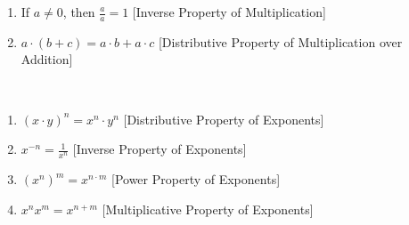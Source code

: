 \documentclass[crop=false,class=article,oneside]{standalone}
\begin{document}
\begin{properties}
\begin{enumerate}
                \item
                    \label{%
                        property:%
                        north_shore_arithmetic_properties_%
                        mult_inverse%
                    }
                    If ${a}\ne{0}$, then $\frac{a}{a}=1$\hfill
                    [Inverse Property of Multiplication]
                \item
                    \label{%
                        property:%
                        north_shore_arithmetic_properties_%
                        distributive_property%
                    }
                    ${a}\cdot{(b+c)}%
                     ={a}\cdot{b}+{a}\cdot{c}$\hfill
                    [Distributive Property of
                     Multiplication over Addition]
            \end{enumerate}
        \end{properties}
        \begin{properties}
            \
            \label{property:North_Shore_Exponent_Rules}
            \begin{enumerate}
                \item
                    \label{%
                        property:%
                        north_shore_distributive_property_%
                        of_expo%
                    }
                    $({x}\cdot{y})^{n}%
                     ={x^{n}}\cdot{y^{n}}$\hfill
                    [Distributive Property of Exponents]
                \item
                    \label{%
                        property:%
                        north_shore_inverse_property_of_expo%
                    }
                    $x^{-n}=\frac{1}{x^n}$\hfill
                    [Inverse Property of Exponents]
                \item
                    \label{%
                        property:%
                        north_shore_power_property_of_expo%
                    }
                    $(x^n)^{m}=x^{{n}\cdot{m}}$\hfill
                    [Power Property of Exponents]
                \item
                    \label{%
                        property:%
                        north_shore_product_property_of_expo%
                    }
                    $x^{n}x^{m}=x^{n+m}$\hfill
                    [Multiplicative Property of Exponents]
            \end{enumerate}
        \end{properties}
\end{document}
